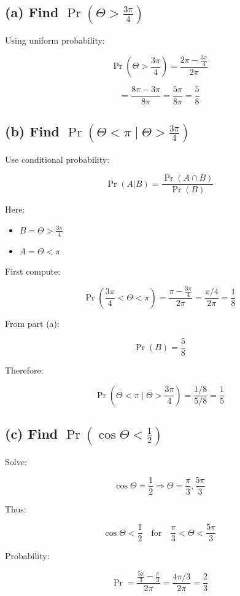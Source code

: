 \documentclass[12pt]{article}
\begin{document}
\subsection*{(a) Find \( \Pr(\Theta > \frac{3\pi}{4}) \)}

Using uniform probability:

\[
\Pr(\Theta > \frac{3\pi}{4})
= \frac{2\pi - \frac{3\pi}{4}}{2\pi}
\]

\[
= \frac{8\pi - 3\pi}{8\pi}
= \frac{5\pi}{8\pi}
= \frac{5}{8}
\]

\subsection*{(b) Find \( \Pr(\Theta < \pi \mid \Theta > \frac{3\pi}{4}) \)}

Use conditional probability:

\[
\Pr(A|B) = \frac{\Pr(A \cap B)}{\Pr(B)}
\]

Here:

\begin{itemize}
\item \( B = \Theta > \frac{3\pi}{4} \)
\item \( A = \Theta < \pi \)
\end{itemize}

First compute:

\[
\Pr\left(\frac{3\pi}{4} < \Theta < \pi\right)
= \frac{\pi - \frac{3\pi}{4}}{2\pi}
= \frac{\pi/4}{2\pi}
= \frac{1}{8}
\]

From part (a):

\[
\Pr(B) = \frac{5}{8}
\]

Therefore:

\[
\Pr(\Theta < \pi \mid \Theta > \frac{3\pi}{4})
= \frac{1/8}{5/8}
= \frac{1}{5}
\]

\subsection*{(c) Find \( \Pr(\cos\Theta < \frac{1}{2}) \)}

Solve:

\[
\cos\Theta = \frac{1}{2}
\Rightarrow \Theta = \frac{\pi}{3}, \frac{5\pi}{3}
\]

Thus:

\[
\cos\Theta < \frac{1}{2}
\quad \text{for} \quad \frac{\pi}{3} < \Theta < \frac{5\pi}{3}
\]

Probability:

\[
\Pr = \frac{\frac{5\pi}{3} - \frac{\pi}{3}}{2\pi}
= \frac{4\pi/3}{2\pi}
= \frac{2}{3}
\]
\end{document}
